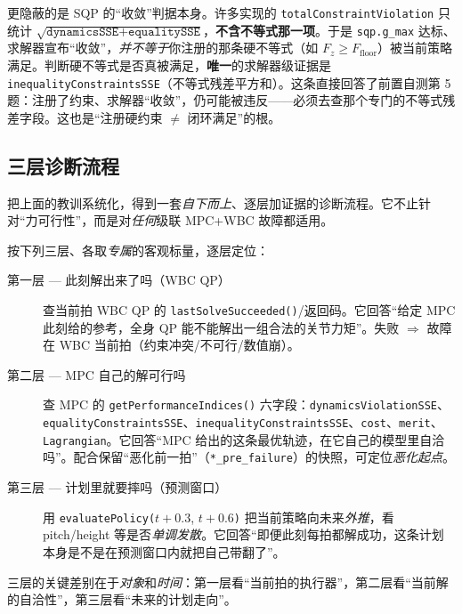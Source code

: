\begin{insight}\label{ins:ld-gmax}
更隐蔽的是 SQP 的“收敛”判据本身。许多实现的 \texttt{totalConstraintViolation} 只统计 $\sqrt{\texttt{dynamicsSSE}+\texttt{equalitySSE}}$，\textbf{不含不等式那一项}。于是 \texttt{sqp.g\_max} 达标、求解器宣布“收敛”，\emph{并不等于}你注册的那条硬不等式（如 $F_z\ge F_{\mathrm{floor}}$）被当前策略满足。判断硬不等式是否真被满足，\textbf{唯一}的求解器级证据是 \texttt{inequalityConstraintsSSE}（不等式残差平方和）。这条直接回答了前置自测第 5 题：注册了约束、求解器“收敛”，仍可能被违反——必须去查那个专门的不等式残差字段。这也是“注册硬约束 $\ne$ 闭环满足”的根。
\end{insight}

\subsection{三层诊断流程}
\label{subsec:ld-flow}

把上面的教训系统化，得到一套\emph{自下而上}、逐层加证据的诊断流程。它不止针对“力可行性”，而是对\emph{任何}级联 MPC+WBC 故障都适用。

\begin{insight}\label{ins:ld-three-layer}
按下列三层、各取\emph{专属}的客观标量，逐层定位：
\begin{description}
  \item[第一层 — 此刻解出来了吗（WBC QP）] 查当前拍 WBC QP 的 \texttt{lastSolveSucceeded()}/返回码。它回答“给定 MPC 此刻给的参考，全身 QP 能不能解出一组合法的关节力矩”。失败 $\Rightarrow$ 故障在 WBC 当前拍（约束冲突/不可行/数值崩）。
  \item[第二层 — MPC 自己的解可行吗] 查 MPC 的 \texttt{getPerformanceIndices()} 六字段：\texttt{dynamicsViolationSSE}、\texttt{equalityConstraintsSSE}、\texttt{inequalityConstraintsSSE}、\texttt{cost}、\texttt{merit}、\texttt{Lagrangian}。它回答“MPC 给出的这条最优轨迹，在它自己的模型里自洽吗”。配合保留“恶化前一拍”（\texttt{*\_pre\_failure}）的快照，可定位\emph{恶化起点}。
  \item[第三层 — 计划里就要摔吗（预测窗口）] 用 \texttt{evaluatePolicy(}$t+0.3$, $t+0.6$\texttt{)} 把当前策略向未来\emph{外推}，看 pitch/height 等是否\emph{单调发散}。它回答“即便此刻每拍都解成功，这条计划本身是不是在预测窗口内就把自己带翻了”。
\end{description}
三层的关键差别在于\emph{对象}和\emph{时间}：第一层看“当前拍的执行器”，第二层看“当前解的自洽性”，第三层看“未来的计划走向”。
\end{insight}

